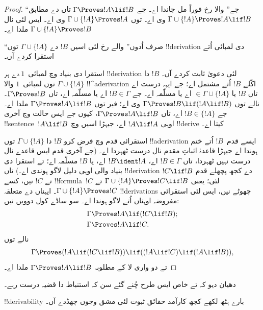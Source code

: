 \documentclass[../../../include/open-logic-section]{subfiles}
\begin{document}
\begin{proof}
``جے'' والا رخ فوراً مل جاندا اے۔ جے $\Gamma \Proves !A \lif !B$
تاں  دے مطابق $\Gamma \cup \{!A\} \Proves !A \lif !B$
وی اے۔  توں $\Gamma \cup \{!A\} \Proves !A$
وی اے۔ ایس لئی  نال $\Gamma \cup
\{!A\} \Proves !B$ ملدا اے۔

``صرف اُدوں'' والے رخ لئی اسیں $!B$ دے $\Gamma \cup \{!A\}$
توں !!{derivation} دی لمبائی اُتے استقرا کردے آں۔

استقرا دی بنیاد وچ لمبائی~$1$ دے ہر !!{derivation} لئی دعویٰ
ثابت کردے آں۔ $!B$ دا $\Gamma \cup \{!A\}$ توں لمبائی~$1$
والا !!^a{derivation} اکّلے $!B$ اُتے مشتمل اے؛ جے ایہہ درست اے
تاں $!B$ یا $\in \Gamma \cup \{!A\}$ اے یا مسلّمہ اے۔ جے
$!B \in \Gamma$ اے یا مسلّمہ اے، تاں $\Gamma \Proves !B$۔
نالے  توں $\Gamma
\Proves !B \lif (!A \lif !B)$ وی اے؛ فیر  توں
$\Gamma \Proves !A \lif !B$ ملدا اے۔ جے $!B \in \{ !A\}$
اے، تاں $\Gamma \Proves !A \lif !B$، کیوں جے ایس حالت وچ آخری
!!{sentence}~$!A \lif !B$ اوہی $!A \lif !A$ اے، جیہڑا اسیں
 وچ !!{derive} کیتا اے۔

استقرائی قدم وچ فرض کرو $!B$ دا $\Gamma \cup \{!A\}$ توں
!!a{derivation} ایسے قدم~$!B$ اُتے ختم ہوندا اے جیہڑا قاعدۂ
اثباتِ مقدم نال درست ٹھہردا اے۔ (جے آخری قدم ایس قاعدے نال درست
نہیں ٹھہردا، تاں $!B \in \Gamma$ اے، $!B
\ident !A$ اے، یا $!B$ مسلّمہ اے؛ تے استقرا دی بنیاد والی
اوہی دلیل لاگو ہوندی اے۔) تاں !!{derivation} دے کجھ پچھلے قدم
$!C \lif !B$ تے $!C$ نیں، کسے !!{formula}~$!C$ لئی؛ یعنی
$\Gamma \cup \{!A\} \Proves !C \lif !B$ تے $\Gamma \cup \{!A\}
\Proves !C$۔ ایہناں دے متعلقہ !!{derivation}s چھوٹے نیں، ایس لئی
استقرائی مفروضہ اوہناں اُتے لاگو ہوندا اے۔ سو ساڈے کول دوویں نیں:
\begin{align*}
  & \Gamma \Proves !A \lif (!C \lif !B); \\
  & \Gamma \Proves !A \lif !C.
\end{align*}
نالے  توں
\[
\Gamma \Proves (!A \lif (!C \lif !B)) \lif
((!A\lif !C)  \lif (!A \lif !B)),
\]
تے  دو واری لا کے مطلوبہ $\Gamma \Proves !A \lif !B$
ملدا اے۔
\end{proof}

دھیان دیو کہ  تے 
خاص ایس طرح چُنے گئے سن کہ استنباط دا قضیہ درست رہے۔

!!{derivability} بارے ہٹھ لکھے کجھ کارآمد حقائق ثبوت لئی مشق
وجوں چھڈدے آں۔
\end{document}
